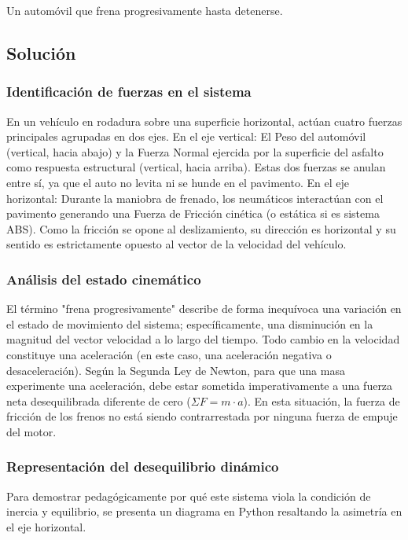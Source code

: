 \documentclass[12pt, a4paper]{article}
\begin{document}
Un automóvil que frena progresivamente hasta detenerse.

\subsection*{Solución}

\subsubsection*{Identificación de fuerzas en el sistema}
En un vehículo en rodadura sobre una superficie horizontal, actúan cuatro fuerzas principales agrupadas en dos ejes.
En el eje vertical: El Peso del automóvil (vertical, hacia abajo) y la Fuerza Normal ejercida por la superficie del asfalto como respuesta estructural (vertical, hacia arriba). Estas dos fuerzas se anulan entre sí, ya que el auto no levita ni se hunde en el pavimento.
En el eje horizontal: Durante la maniobra de frenado, los neumáticos interactúan con el pavimento generando una Fuerza de Fricción cinética (o estática si es sistema ABS). Como la fricción se opone al deslizamiento, su dirección es horizontal y su sentido es estrictamente opuesto al vector de la velocidad del vehículo.

\subsubsection*{Análisis del estado cinemático}
El término "frena progresivamente" describe de forma inequívoca una variación en el estado de movimiento del sistema; específicamente, una disminución en la magnitud del vector velocidad a lo largo del tiempo. Todo cambio en la velocidad constituye una aceleración (en este caso, una aceleración negativa o desaceleración). Según la Segunda Ley de Newton, para que una masa experimente una aceleración, debe estar sometida imperativamente a una fuerza neta desequilibrada diferente de cero ($\Sigma F = m \cdot a$). En esta situación, la fuerza de fricción de los frenos no está siendo contrarrestada por ninguna fuerza de empuje del motor.

\subsubsection*{Representación del desequilibrio dinámico}
Para demostrar pedagógicamente por qué este sistema viola la condición de inercia y equilibrio, se presenta un diagrama en Python resaltando la asimetría en el eje horizontal.
\end{document}
